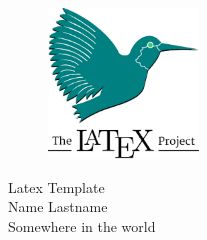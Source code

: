 \documentclass[14pt,a4paper]{extarticle}
\begin{document}
\begin{titlepage}
  \begin{figure}
    \centering
    \includegraphics[width=4cm]{latex.png}
  \end{figure}
  \begin{center}
    \Huge Latex Template \\
    \vspace{5cm} 
    \LARGE Name Lastname \\
    \vfill
    \LARGE Somewhere in the world
    \pagebreak
  \end{center}
\end{titlepage}

\end{document}
